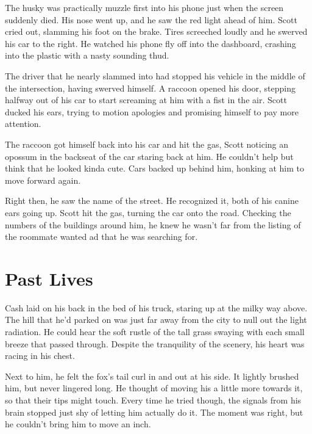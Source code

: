 The husky was practically muzzle first into his phone just when the screen suddenly died. His nose went up, and he saw the red light ahead of him. Scott cried out, slamming his foot on the brake. Tires screeched loudly and he swerved his car to the right. He watched his phone fly off into the dashboard, crashing into the plastic with a nasty sounding thud.

The driver that he nearly slammed into had stopped his vehicle in the middle of the intersection, having swerved himself. A raccoon opened his door, stepping halfway out of his car to start screaming at him with a fist in the air. Scott ducked his ears, trying to motion apologies and promising himself to pay more attention.

The raccoon got himself back into his car and hit the gas, Scott noticing an opossum in the backseat of the car staring back at him. He couldn't help but think that he looked kinda cute. Cars backed up behind him, honking at him to move forward again.

Right then, he saw the name of the street. He recognized it, both of his canine ears going up. Scott hit the gas, turning the car onto the road. Checking the numbers of the buildings around him, he knew he wasn't far from the listing of the roommate wanted ad that he was searching for.

\cleartoverso


\chapter*{Past Lives}


Cash laid on his back in the bed of his truck, staring up at the milky way above. The hill that he'd parked on was just far away from the city to null out the light radiation. He could hear the soft rustle of the tall grass swaying with each small breeze that passed through. Despite the tranquility of the scenery, his heart was racing in his chest.

Next to him, he felt the fox's tail curl in and out at his side. It lightly brushed him, but never lingered long. He thought of moving his a little more towards it, so that their tips might touch. Every time he tried though, the signals from his brain stopped just shy of letting him actually do it. The moment was right, but he couldn't bring him to move an inch.

